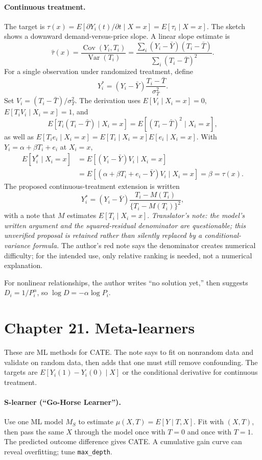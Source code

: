 \paragraph{Continuous treatment.}
The target is $\tau(x)=E[\partial Y_i(t)/\partial t\mid X=x]=E[\tau_i\mid X=x]$. The sketch shows a downward demand-versus-price slope. A linear slope estimate is
\[\hat\tau(x)=\frac{\operatorname{Cov}(Y_i,T_i)}{\operatorname{Var}(T_i)}
=\frac{\sum_i(Y_i-\bar Y)(T_i-\bar T)}{\sum_i(T_i-\bar T)^2}.
\]
For a single observation under randomized treatment, define
\[Y_i^*=(Y_i-\bar Y)\frac{T_i-\bar T}{\sigma_T^2}.\]
Set $V_i=(T_i-\bar T)/\sigma_T^2$. The derivation uses $E[V_i\mid X_i=x]=0$, $E[T_iV_i\mid X_i=x]=1$, and
\[E[T_i(T_i-\bar T)\mid X_i=x]=E[(T_i-\bar T)^2\mid X_i=x],\]
as well as $E[T_ie_i\mid X_i=x]=E[T_i\mid X_i=x]E[e_i\mid X_i=x]$. With $Y_i=\alpha+\beta T_i+e_i$ at $X_i=x$,
\begin{align*}
E[Y_i^*\mid X_i=x]
&=E[(Y_i-\bar Y)V_i\mid X_i=x]\\
&=E[(\alpha+\beta T_i+e_i-\bar Y)V_i\mid X_i=x]=\beta=\tau(x).
\end{align*}
The proposed continuous-treatment extension is written
\[Y_i^*=(Y_i-\bar Y)\frac{T_i-M(T_i)}{\{T_i-M(T_i)\}^2},\]
with a note that $M$ estimates $E[T_i\mid X_i=x]$. \textit{Translator's note: the model's written argument and the squared-residual denominator are questionable; this unverified proposal is retained rather than silently replaced by a conditional-variance formula.} The author's red note says the denominator creates numerical difficulty; for the intended use, only relative ranking is needed, not a numerical explanation.

For nonlinear relationships, the author writes ``no solution yet,'' then suggests $D_i=1/P_i^\alpha$, so $\log D=-\alpha\log P_i$.

\section{Chapter 21. Meta-learners}
These are ML methods for CATE. The note says to fit on nonrandom data and validate on random data, then adds that one must still remove confounding. The targets are $E[Y_i(1)-Y_i(0)\mid X]$ or the conditional derivative for continuous treatment.

\paragraph{S-learner (``Go-Horse Learner'').}
Use one ML model $M_S$ to estimate $\mu(X,T)=E[Y\mid T,X]$. Fit with $(X,T)$, then pass the same $X$ through the model once with $T=0$ and once with $T=1$. The predicted outcome difference gives CATE. A cumulative gain curve can reveal overfitting; tune \texttt{max\_depth}.

